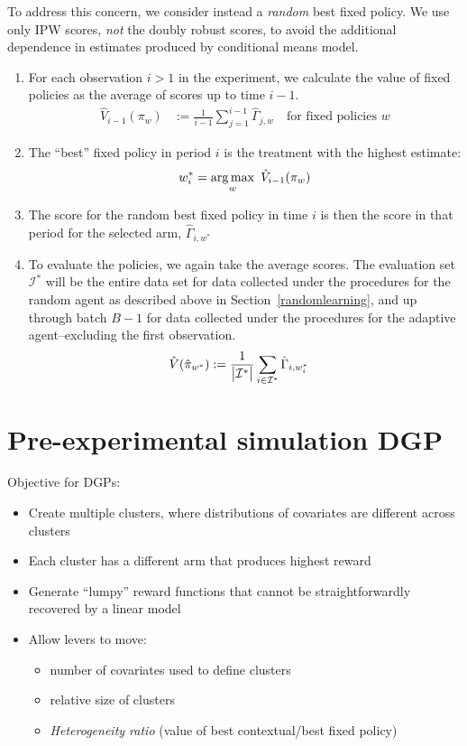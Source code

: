 \documentclass[letterpaper, 12pt, parskip=full,]{scrartcl}
\begin{document}
To address this concern, we consider instead a \textit{random} best fixed policy. We use only IPW scores, \textit{not} the doubly robust scores, to avoid the additional dependence in estimates produced by conditional means model. 
\begin{enumerate}
\item For each observation $i>1$ in the experiment, we calculate the value of fixed policies as the average of scores up to time $i-1$. 
\begin{align*}
\hat{V}_{i-1}({\pi}_{w})  &:= \frac{1}{i-1 } \sum_{j = 1 }^{i-1} \hat{\Gamma}_{j,w} \quad \text{for fixed policies $w$}
\end{align*}
\item The ``best'' fixed policy in period $i$ is the treatment with the highest estimate:
\begin{align*}
w_i^* =  \operatorname*{arg\,max}_w \ \hat{V}_{i-1}({\pi}_{w})
\end{align*}
\item The score for the random best fixed policy in time $i$ is then the score in that period for the selected arm, $\hat{\Gamma}_{i, w^*}$ 
 \item To evaluate the policies, we again take the average scores. The evaluation set $\mathcal{I}^*$ will be the entire data set for data collected under the procedures for the random agent as described above in Section~\ref{randomlearning}, and up through batch $B-1$ for data collected under the procedures for the adaptive agent--excluding the first observation. 
    \begin{align*}
          \hat{V}(\hat{\pi}_{w^*})  &:= \frac{1}{\big{\lvert} \mathcal{I}^* \big{\rvert}} \sum_{i \in \mathcal{I}^* } 
          \hat{\Gamma}_{i, w_i^*} 
  \end{align*}
\end{enumerate}


\section{Pre-experimental simulation DGP}\label{appendix:dgp}

Objective for DGPs:
\begin{itemize}
    \item Create multiple clusters, where distributions of covariates are different across clusters
    \item Each cluster has a different arm that produces highest reward
    \item Generate ``lumpy'' reward functions that cannot be straightforwardly recovered by a linear model
    \item Allow levers to move:
    \begin{itemize}
        \item number of covariates used to define clusters
        \item relative size of clusters
        \item \textit{Heterogeneity ratio} (value of best contextual/best fixed policy)
    \end{itemize} 
\end{itemize}
\end{document}
